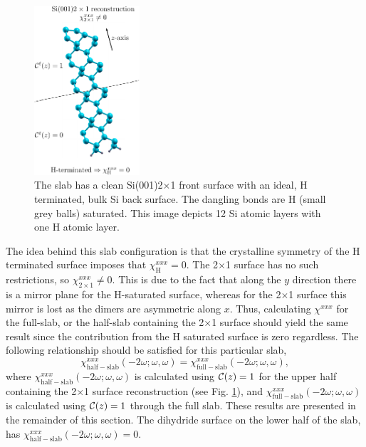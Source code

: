 \documentclass[11pt]{book}
\begin{document}
{\begin{figure}
\centering 
\includegraphics[width=0.35\textwidth]{../figures/04-results/fig-4_1_01}
\caption{The slab has a clean Si(001)2$\times$1 front surface with an ideal, H
terminated, bulk Si back surface. The dangling bonds are H (small grey balls)
saturated. This image depicts 12 Si atomic layers with one H atomic layer.
\label{fig:si2x1}} 
\end{figure} 

The idea behind this slab configuration is that the crystalline symmetry of the
H terminated surface imposes that $\chi_{\mathrm{H}}^{xxx}=0$. The 2$\times$1
surface has no such restrictions, so $\chi_{2\times 1}^{xxx}\ne 0$. This is due
to the fact that along the $y$ direction there is a mirror plane for the
H-saturated surface, whereas for the 2$\times$1 surface this mirror is lost as
the dimers are asymmetric along $x$. Thus, calculating $\chi^{xxx}$ for the
full-slab, or the half-slab containing the 2$\times$1 surface \cite{note1}
should yield the same result since the contribution from the H saturated surface
is zero regardless. The following relationship should be satisfied for this
particular slab,
\begin{equation*}
\chi_{\mathrm{half-slab}}^{xxx}(-2\omega;\omega,\omega) =
\chi_{\mathrm{full-slab}}^{xxx}(-2\omega;\omega,\omega),
\end{equation*}
where $\chi_{\mathrm{half-slab}}^{xxx}(-2\omega;\omega,\omega)$ is calculated
using ${\mathbf{\cal C}}(z)=1$ for the upper half containing the 2$\times$1
surface reconstruction (see Fig. \ref{fig:si2x1}), and
$\chi_{\mathrm{full-slab}}^{xxx}(-2\omega;\omega,\omega)$ is calculated using
${\mathbf{\cal C}}(z)=1$ through the full slab. These results are presented in
the remainder of this section. The dihydride surface on the lower half of the
slab, has $\chi_{\mathrm{half-slab}}^{xxx}(-2\omega;\omega,\omega)=0$.

}
\end{document}
